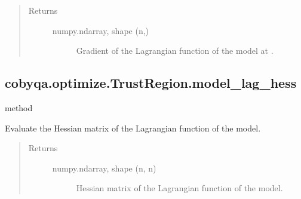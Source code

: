 \documentclass[letterpaper,10pt,english]{sphinxmanual}
\begin{document}
\begin{fulllineitems}
\begin{fulllineitems}
\begin{quote}
\begin{description}
\begin{description}
\end{description}

\item[{Returns}] \leavevmode\begin{description}
\item[{numpy.ndarray, shape (n,)}] \leavevmode
\sphinxAtStartPar
Gradient of the Lagrangian function of the model at .

\end{description}

\end{description}\end{quote}

\end{fulllineitems}



\subsection{cobyqa.optimize.TrustRegion.model\_lag\_hess}
\label{\detokenize{refs/generated/cobyqa.optimize.TrustRegion.model_lag_hess:cobyqa-optimize-trustregion-model-lag-hess}}\label{\detokenize{refs/generated/cobyqa.optimize.TrustRegion.model_lag_hess::doc}}
\sphinxAtStartPar
method

\begin{fulllineitems}
\label{\detokenize{refs/generated/cobyqa.optimize.TrustRegion.model_lag_hess:cobyqa.optimize.TrustRegion.model_lag_hess}}
\sphinxAtStartPar
Evaluate the Hessian matrix of the Lagrangian function of the model.
\begin{quote}\begin{description}
\item[{Returns}] \leavevmode\begin{description}
\item[{numpy.ndarray, shape (n, n)}] \leavevmode
\sphinxAtStartPar
Hessian matrix of the Lagrangian function of the model.

\end{description}

\end{description}\end{quote}

\end{fulllineitems}




\end{fulllineitems}
\end{document}
